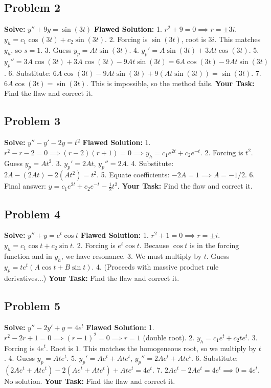 \documentclass[12pt]{article}
\begin{document}
\subsection{Problem 2}
\textbf{Solve:} $y'' + 9y = \sin(3t)$
\textbf{Flawed Solution:}
1. $r^2 + 9 = 0 \implies r = \pm 3i$. $y_h = c_1 \cos(3t) + c_2 \sin(3t)$.
2. Forcing is $\sin(3t)$, root is $3i$. This matches $y_h$, so $s=1$.
3. Guess $y_p = A t \sin(3t)$.
4. $y_p' = A \sin(3t) + 3At \cos(3t)$.
5. $y_p'' = 3A \cos(3t) + 3A \cos(3t) - 9At \sin(3t) = 6A \cos(3t) - 9At \sin(3t)$.
6. Substitute: $6A \cos(3t) - 9At \sin(3t) + 9(A t \sin(3t)) = \sin(3t)$.
7. $6A \cos(3t) = \sin(3t)$. This is impossible, so the method fails.
\textbf{Your Task:} Find the flaw and correct it.

\subsection{Problem 3}
\textbf{Solve:} $y'' - y' - 2y = t^2$
\textbf{Flawed Solution:}
1. $r^2 - r - 2 = 0 \implies (r-2)(r+1) = 0 \implies y_h = c_1 e^{2t} + c_2 e^{-t}$.
2. Forcing is $t^2$. Guess $y_p = A t^2$.
3. $y_p' = 2At$, $y_p'' = 2A$.
4. Substitute: $2A - (2At) - 2(A t^2) = t^2$.
5. Equate coefficients: $-2A = 1 \implies A = -1/2$.
6. Final answer: $y = c_1 e^{2t} + c_2 e^{-t} - \frac{1}{2}t^2$.
\textbf{Your Task:} Find the flaw and correct it.

\subsection{Problem 4}
\textbf{Solve:} $y'' + y = e^t \cos t$
\textbf{Flawed Solution:}
1. $r^2 + 1 = 0 \implies r = \pm i$. $y_h = c_1 \cos t + c_2 \sin t$.
2. Forcing is $e^t \cos t$. Because $\cos t$ is in the forcing function and in $y_h$, we have resonance.
3. We must multiply by $t$. Guess $y_p = t e^t (A \cos t + B \sin t)$.
4. (Proceeds with massive product rule derivatives...)
\textbf{Your Task:} Find the flaw and correct it.

\subsection{Problem 5}
\textbf{Solve:} $y'' - 2y' + y = 4e^t$
\textbf{Flawed Solution:}
1. $r^2 - 2r + 1 = 0 \implies (r-1)^2 = 0 \implies r = 1$ (double root).
2. $y_h = c_1 e^t + c_2 t e^t$.
3. Forcing is $4e^t$. Root is $1$. This matches the homogeneous root, so we multiply by $t$.
4. Guess $y_p = A t e^t$.
5. $y_p' = A e^t + A t e^t$, $y_p'' = 2A e^t + A t e^t$.
6. Substitute: $(2A e^t + A t e^t) - 2(A e^t + A t e^t) + A t e^t = 4e^t$.
7. $2A e^t - 2A e^t = 4e^t \implies 0 = 4e^t$. No solution.
\textbf{Your Task:} Find the flaw and correct it.
\end{document}
